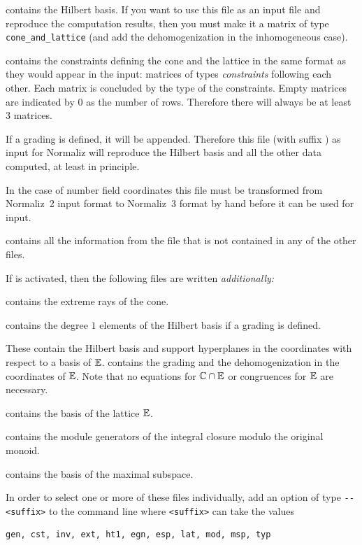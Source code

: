 \begin{itemize}
	\itemtt[gen] contains the Hilbert basis. If you want to use this file as an input file and reproduce the computation results, then you must make it a matrix of type \verb|cone_and_lattice| (and add the dehomogenization in the inhomogeneous case).
	
	\itemtt[cst] contains the constraints defining the cone
	and the lattice in the same format as they would appear
	in the input: matrices of types \emph{constraints} following each
	other. Each matrix is concluded by the type of the constraints.
	Empty matrices are indicated by $0$ as the
	number of rows. Therefore there will always be at least
	$3$ matrices.
	
	If a grading is defined, it will be appended. Therefore
	this file (with suffix ) as input for
	Normaliz will reproduce the Hilbert basis and all the
	other data computed, at least in principle.
	
	In the case of number field coordinates this file must be transformed from Normaliz~2 input format to Normaliz~3 format by hand before it can be used for input.
	
	\itemtt[inv] contains all the information from the
	file  that is not contained in any of the
	other files.
\end{itemize}

If  is activated, then the following files are written
\emph{additionally:}

\begin{itemize}
	
	\itemtt[ext] contains the extreme rays of the cone.
	
	\itemtt[ht1] contains the degree $1$ elements of the
	Hilbert basis if a grading is defined.
	
	 These contain the Hilbert basis and
	support hyperplanes in the coordinates with respect to
	a basis of ${\mathbb E}$.  contains the grading and the dehomogenization in the
	coordinates of ${\mathbb E}$. Note that no
	equations for ${\mathbb C}\cap{\mathbb E}$ or congruences for ${\mathbb E}$ are
	necessary.
	
	\itemtt[lat] contains the basis of the lattice ${\mathbb E}$.
	
	\itemtt[mod] contains the module generators of the integral closure modulo the original monoid.
	
	\itemtt[msp] contains the basis of the maximal subspace.
\end{itemize}

In order to select one or more of these files individually, add an option of type \verb|--<suffix>| to the command line where \verb|<suffix>| can take the values
\begin{Verbatim}
gen, cst, inv, ext, ht1, egn, esp, lat, mod, msp, typ
\end{Verbatim}

